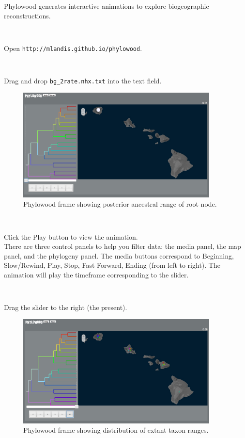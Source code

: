\documentclass[11pt]{article}
\newcommand{\impmark}{\strut\vadjust{\domark}}
\newcommand{\domark}{%
  \vbox to 0pt{
    \kern-\dp\strutbox
    \smash{\llap{$\rightarrow$\kern1em}}
    \vss
  }%
}
\begin{document}
Phylowood generates interactive animations to explore biogeographic reconstructions.

\noindent \\ \impmark Open \texttt{http://mlandis.github.io/phylowood}.

\noindent \\ \impmark Drag and drop \texttt{bg\_2rate.nhx.txt} into the text field.

\begin{figure}[H]
\centering
\includegraphics[width=4in]{figures/phw_mrca}
\caption{Phylowood frame showing posterior ancestral range of root node.}
\end{figure}

\noindent \\ \impmark Click the Play button to view the animation. \\

There are three control panels to help you filter data: the media panel, the map panel, and the phylogeny panel.
The media buttons correspond to Beginning, Slow/Rewind, Play, Stop, Fast Forward, Ending (from left to right).
The animation will play the timeframe corresponding to the slider.

\noindent \\ \impmark Drag the slider to the right (the present).

\begin{figure}[H]
\centering
\includegraphics[width=4in]{figures/phw_all}
\caption{Phylowood frame showing distribution of extant taxon ranges.}
\end{figure}
\end{document}
